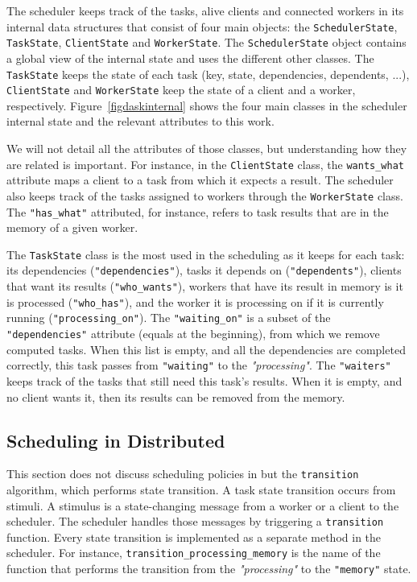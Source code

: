 The scheduler keeps track of the tasks, alive clients and connected workers in its internal data structures that consist of four main objects: the \texttt{SchedulerState}, \texttt{TaskState}, \texttt{ClientState} and \texttt{WorkerState}.
The \texttt{SchedulerState} object contains a global view of the internal state and uses the different other classes. The \texttt{TaskState} keeps the state of each task (key, state, dependencies, dependents, ...), \texttt{ClientState} and \texttt{WorkerState} keep the state of a client and a worker, respectively.
Figure~\ref{figdaskinternal} shows the four main classes in the \dask scheduler internal state and the relevant attributes to this work. 

We will not detail all the attributes of those classes, but understanding how they are related is important. 
For instance, in the \texttt{ClientState} class, the \texttt{wants\_what} attribute maps a client to a task from which it expects a result. The scheduler also keeps track of the tasks assigned to workers through the \texttt{WorkerState} class. The \texttt{"has\_what"} attributed, for instance, refers to task results that are in the memory of a given worker. 

The \texttt{TaskState} class is the most used in the scheduling as it keeps for each task: its dependencies (\texttt{"dependencies"}), tasks it depends on (\texttt{"dependents"}), clients that want its results (\texttt{"who\_wants"}), workers that have its result in memory is it is processed (\texttt{"who\_has"}), and the worker it is processing on if it is currently running (\texttt{"processing\_on"}). The \texttt{"waiting\_on"} is a subset of the \texttt{"dependencies"} attribute (equals at the beginning), from which we remove computed tasks. When this list is empty, and all the dependencies are completed correctly, this task passes from \texttt{"waiting"} to the \textit{"processing"}. 
The \texttt{"waiters"} keeps track of the tasks that still need this task's results. When it is empty, and no client wants it, then its results can be removed from the \dask memory.  


\subsection{Scheduling in \dask Distributed}\label{sec:scheduling}

This section does not discuss \dask scheduling policies in \dask but the \texttt{transition} algorithm, which performs state transition.
A task state transition occurs from stimuli. A stimulus is a state-changing message from a worker or a client to the scheduler. 
The scheduler handles those messages by triggering a \texttt{transition} function. Every state transition is implemented as a separate method in the scheduler. For instance, \texttt{transition\_processing\_memory} is the name of the function that performs the transition from the \textit{"processing"} to the \texttt{"memory"} state.

